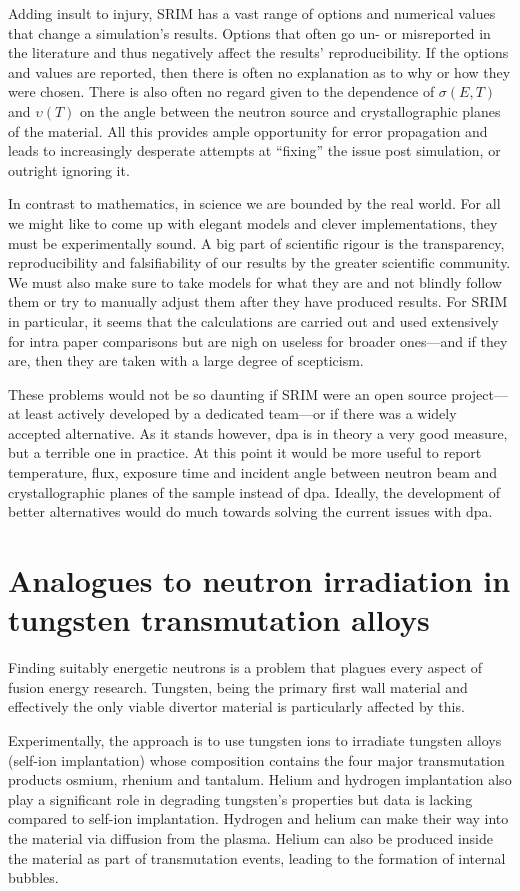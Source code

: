 \documentclass[12pt, a4paper]{article}
\begin{document}
		Adding insult to injury, SRIM has a vast range of options and numerical values that change a simulation's results. Options that often go un- or misreported in the literature and thus negatively affect the results' reproducibility. If the options and values are reported, then there is often no explanation as to why or how they were chosen. There is also often no regard given to the dependence of $\sigma (E,T)$ and $\upsilon (T)$ on the angle between the neutron source and crystallographic planes of the material. All this provides ample opportunity for error propagation and leads to increasingly desperate attempts at ``fixing'' the issue post simulation, or outright ignoring it.
		
		In contrast to mathematics, in science we are bounded by the real world. For all we might like to come up with elegant models and clever implementations, they must be experimentally sound. A big part of scientific rigour is the transparency, reproducibility and falsifiability of our results by the greater scientific community. We must also make sure to take models for what they are and not blindly follow them or try to manually adjust them after they have produced results. For SRIM in particular, it seems that the calculations are carried out and used extensively for intra paper comparisons but are nigh on useless for broader ones---and if they are, then they are taken with a large degree of scepticism.
		
		These problems would not be so daunting if SRIM were an open source project---at least actively developed by a dedicated team---or if there was a widely accepted alternative. As it stands however, dpa is in theory a very good measure, but a terrible one in practice. At this point it would be more useful to report temperature, flux, exposure time and incident angle between neutron beam and crystallographic planes of the sample instead of dpa. Ideally, the development of better alternatives would do much towards solving the current issues with dpa.
	\section{Analogues to neutron irradiation in tungsten transmutation alloys}\label{s:ni}
		Finding suitably energetic neutrons is a problem that plagues every aspect of fusion energy research. Tungsten, being the primary first wall material and effectively the only viable divertor material is particularly affected by this. 
		
		Experimentally, the approach is to use tungsten ions to irradiate tungsten alloys (self-ion implantation) whose composition contains the four major transmutation products osmium, rhenium and tantalum. Helium and hydrogen implantation also play a significant role in degrading tungsten's properties but data is lacking compared to self-ion implantation. Hydrogen and helium can make their way into the material via diffusion from the plasma. Helium can also be produced inside the material as part of transmutation events, leading to the formation of internal bubbles.
		
\end{document}
